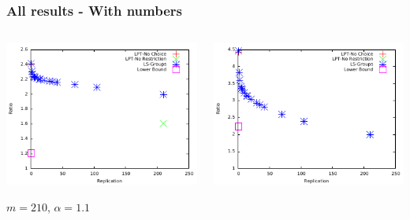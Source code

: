 \documentclass[usenames,dvipsnames]{beamer}
\begin{document}
\begin{frame}
  \frametitle{All results - With numbers}

  \vspace{-1.5em}

  \begin{columns}

    \begin{center}
      \includegraphics[width=\textwidth]{figs/alpha_11.pdf}
      
      {\footnotesize $m=210$, $\alpha=1.1$}
    \end{center}
    

  
    \begin{center}
      \includegraphics[width=\textwidth]{figs/alpha_15.pdf}


\end{center}
\end{columns}
\end{frame}
\end{document}
